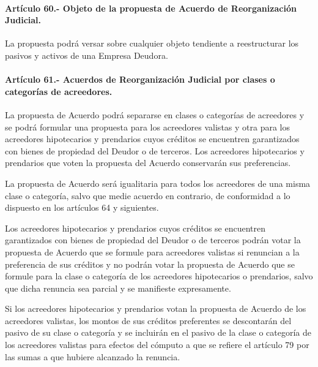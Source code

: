 \documentclass[
]{book}
\begin{document}
\hypertarget{artuxedculo-60.--objeto-de-la-propuesta-de-acuerdo-de-reorganizaciuxf3n-judicial.}{%
\paragraph*{Artículo 60.- Objeto de la propuesta de Acuerdo de Reorganización Judicial.}\label{artuxedculo-60.--objeto-de-la-propuesta-de-acuerdo-de-reorganizaciuxf3n-judicial.}}

La propuesta podrá versar sobre cualquier objeto tendiente a reestructurar los pasivos y activos de una Empresa Deudora.

\hypertarget{artuxedculo-61.--acuerdos-de-reorganizaciuxf3n-judicial-por-clases-o-categoruxedas-de-acreedores.}{%
\paragraph*{Artículo 61.- Acuerdos de Reorganización Judicial por clases o categorías de acreedores.}\label{artuxedculo-61.--acuerdos-de-reorganizaciuxf3n-judicial-por-clases-o-categoruxedas-de-acreedores.}}

La propuesta de Acuerdo podrá separarse en clases o categorías de acreedores y se podrá formular una propuesta para los acreedores valistas y otra para los acreedores hipotecarios y prendarios cuyos créditos se encuentren garantizados con bienes de propiedad del Deudor o de terceros. Los acreedores hipotecarios y prendarios que voten la propuesta del Acuerdo conservarán sus preferencias.

La propuesta de Acuerdo será igualitaria para todos los acreedores de una misma clase o categoría, salvo que medie acuerdo en contrario, de conformidad a lo dispuesto en los artículos 64 y siguientes.

Los acreedores hipotecarios y prendarios cuyos créditos se encuentren garantizados con bienes de propiedad del Deudor o de terceros podrán votar la propuesta de Acuerdo que se formule para acreedores valistas si renuncian a la preferencia de sus créditos y no podrán votar la propuesta de Acuerdo que se formule para la clase o categoría de los acreedores hipotecarios o prendarios, salvo que dicha renuncia sea parcial y se manifieste expresamente.

Si los acreedores hipotecarios y prendarios votan la propuesta de Acuerdo de los acreedores valistas, los montos de sus créditos preferentes se descontarán del pasivo de su clase o categoría y se incluirán en el pasivo de la clase o categoría de los acreedores valistas para efectos del cómputo a que se refiere el artículo 79 por las sumas a que hubiere alcanzado la renuncia.
\end{document}
